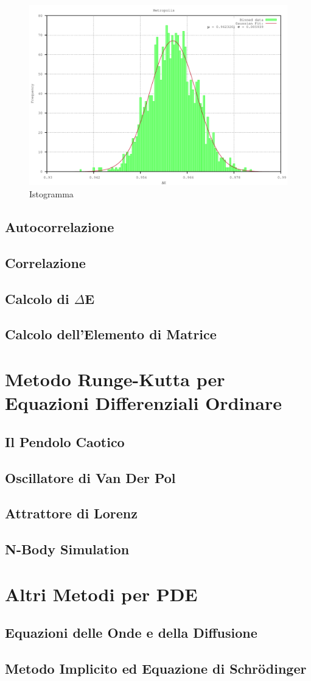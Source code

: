 \documentclass[a4paper,11pt]{report}
\begin{document}
\begin{figure}[htb]
\centering
\includegraphics[width=\textwidth]{histogram}
\caption{Istogramma}
\label{fig:histogram}
\end{figure}

\section{Autocorrelazione}
\section{Correlazione}
\section{Calcolo di $\Delta$E}
\section{Calcolo dell'Elemento di Matrice}

\chapter{\huge Metodo Runge-Kutta per Equazioni Differenziali Ordinare}

\section{Il Pendolo Caotico}
\section{Oscillatore di Van Der Pol}
\section{Attrattore di Lorenz}
\section{N-Body Simulation}

\chapter{\huge Altri Metodi per PDE}

\section{Equazioni delle Onde e della Diffusione}
\section{Metodo Implicito ed Equazione di Schr\"{o}dinger}
\end{document}
